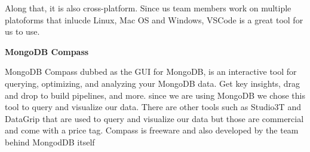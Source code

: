 Along that, it is also cross-platform. Since us team members work on multiple platoforms that inlucde Linux, Mac OS and Windows, VSCode is a great tool for us to use.

\hspace{5mm}


\textbf{MongoDB Compass}


MongoDB Compass dubbed as the GUI for MongoDB, is an interactive tool for querying, optimizing, and analyzing your MongoDB data. Get key insights, drag and drop to build pipelines, and more. since we are using MongoDB we chose this tool to query and visualize our data. There are other tools such as Studio3T and DataGrip that are used to query and visualize our data but those are commercial and come with a price tag. Compass is freeware and also developed by the team behind MongodDB itself



